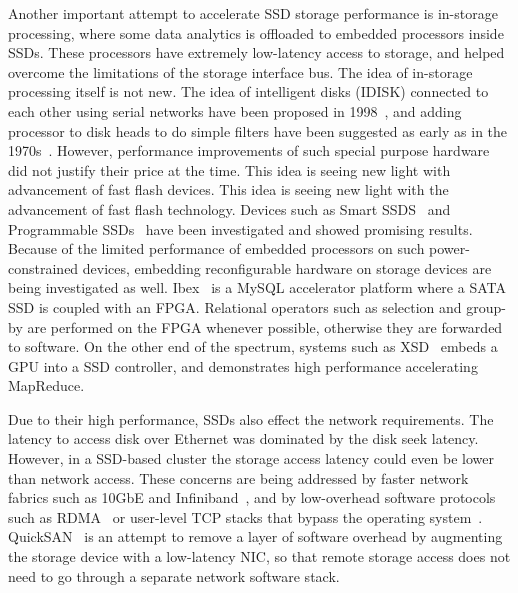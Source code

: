 Another important attempt to accelerate SSD storage performance is in-storage
processing, where some data analytics is offloaded to embedded processors inside
SSDs. These processors have extremely low-latency access to storage, and helped
overcome the limitations of the storage interface bus. The idea of in-storage
processing itself is not new. The idea of intelligent disks (IDISK) connected to
each other using serial networks have been proposed in 1998~\cite{idisk}, and
adding processor to disk heads to do simple filters have been suggested as early
as in the 1970s~\cite{searchprocessor,RAP,dbc}. However, performance improvements of such special
purpose hardware did not justify their price at the time. This idea is seeing
new light with advancement of fast flash devices. This idea is seeing new light
with the advancement of fast flash technology. Devices such as Smart
SSDS~\cite{smartssdquery,smartssdcost,ucsd_willow} and Programmable
SSDs~\cite{xsd} have been investigated and showed promising results. Because of
the limited performance of embedded processors on such power-constrained
devices, embedding reconfigurable hardware on storage devices are being
investigated as well. Ibex~\cite{ibex} is a MySQL accelerator platform where a
SATA SSD is coupled with an FPGA. Relational operators such as selection and
group-by are performed on the FPGA whenever possible, otherwise they are
forwarded to software. On the other end of the spectrum, systems such as
XSD~\cite{xsd} embeds a GPU into a SSD controller, and demonstrates high
performance accelerating MapReduce.

Due to their high performance, SSDs also effect the network requirements.  The
latency to access disk over Ethernet was dominated by the disk seek latency.
However, in a SSD-based cluster the storage access latency could even be lower
than network access. These concerns are being addressed by faster network
fabrics such as 10GbE and Infiniband~\cite{infiniband}, and by low-overhead
software protocols such as RDMA~\cite{rdmampi, rdmahdfs, homrmapreduce, rdmahpc,
rdmampi, hadoopinfiniband} or user-level TCP stacks that bypass the operating
system~\cite{usertcp,userlevelprotocol}. QuickSAN~\cite{ucsd_quicksan} is an
attempt to remove a layer of software overhead by augmenting the storage device
with a low-latency NIC, so that remote storage access does not need to go
through a separate network software stack.


